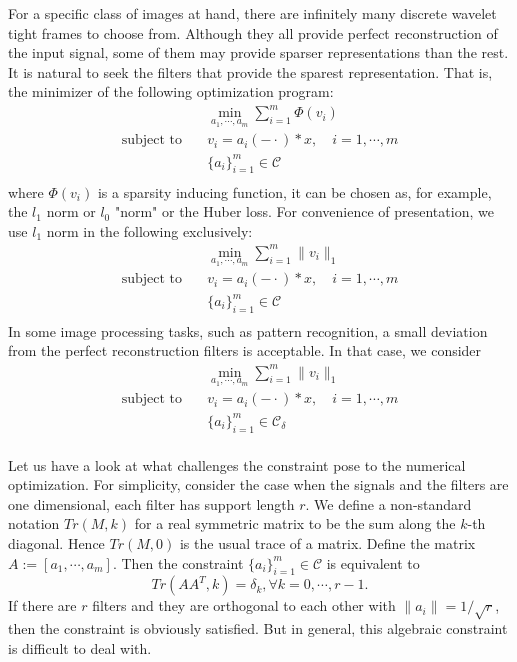 \documentclass[a4paper]{article}
\begin{document}
For a specific class of images at hand, there are infinitely many discrete wavelet tight frames to choose from. Although they all provide perfect reconstruction of the input signal, some of them may provide sparser representations than the rest. It is natural to seek the filters that provide the sparest representation. That is, the minimizer of the following optimization program:
\begin{equation}
	\begin{aligned}
		&\min_{a_1,\cdots,a_m} \sum_{i=1}^m\Phi(v_i) \\
		\textrm{subject to} \quad&v_i = a_i(-\cdot)*x,\quad i=1,\cdots,m\\
		 & \{a_i\}_{i=1}^m \in \mathcal{C} \\
	\end{aligned}
\end{equation}
where $\Phi(v_i)$ is a sparsity inducing function, it can be chosen as, for example, the $l_1$ norm or $l_0$ "norm" or the Huber loss. For convenience of presentation, we use $l_1$ norm in the following exclusively:\begin{equation}
\label{model:m0}
	\begin{aligned}
		&\min_{a_1,\cdots,a_m} \sum_{i=1}^m \|v_i\|_1 \\
		\textrm{subject to} \quad&v_i = a_i(-\cdot)*x,\quad i=1,\cdots,m\\
		 & \{a_i\}_{i=1}^m \in \mathcal{C} \\
	\end{aligned}
\end{equation}
In some image processing tasks, such as pattern recognition, a small deviation from the perfect reconstruction filters is acceptable. In that case, we consider
\begin{equation}
\label{model:m1}
	\begin{aligned}
		&\min_{a_1,\cdots,a_m} \sum_{i=1}^m \|v_i\|_1 \\
		\textrm{subject to} \quad&v_i = a_i(-\cdot)*x,\quad i=1,\cdots,m\\
		 & \{a_i\}_{i=1}^m \in \mathcal{C_\delta} \\
	\end{aligned}
\end{equation}



Let us have a look at what challenges the constraint pose to the numerical optimization. For simplicity, consider the case when the signals and the filters are one dimensional, each filter has support length $r$. We define a non-standard notation $Tr(M,k)$ for a real symmetric matrix to be the sum along the $k$-th diagonal. Hence $Tr(M,0)$ is the usual trace of a matrix.
Define the matrix  $A:=[a_1,\cdots,a_m]$. Then the constraint $ \{a_i\}_{i=1}^m \in \mathcal{C}$ is equivalent to 
\[
Tr(AA^T,k)=\delta_k,\forall k=0,\cdots,r-1.
\]
If there are $r$ filters and they are orthogonal to each other with $\|a_i\|=1/\sqrt{r}$, then the constraint is obviously satisfied. But in general, this algebraic constraint is difficult to deal with. 
\end{document}
